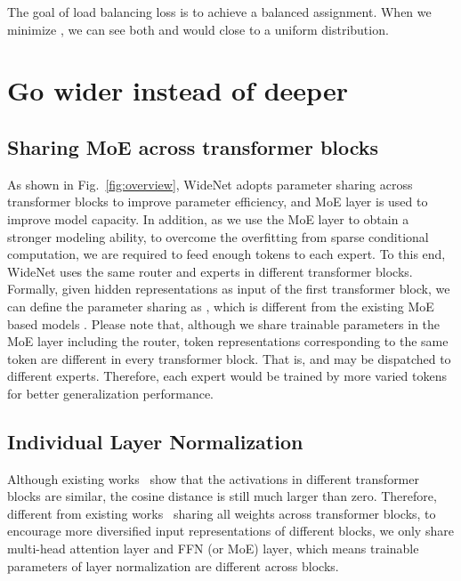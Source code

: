 \documentclass[letterpaper]{article} \usepackage{aaai22}  \usepackage{times}  \usepackage{helvet}  \usepackage{courier}  \usepackage[hyphens]{url}  \usepackage{graphicx} \urlstyle{rm} \def\UrlFont{\rm}  \usepackage{natbib}  \usepackage{caption} \DeclareCaptionStyle{ruled}{labelfont=normalfont,labelsep=colon,strut=off} \frenchspacing  \setlength{\pdfpagewidth}{8.5in}  \setlength{\pdfpageheight}{11in}  \usepackage{algorithm}
\begin{document}
The goal of load balancing loss is to achieve a balanced assignment. When we minimize , we can see both  and  would close to a uniform distribution. 




\section{Go wider instead of deeper}
\label{sec:wide}


\subsection{Sharing MoE across transformer blocks}



As shown in Fig.~\ref{fig:overview}, WideNet adopts parameter sharing across transformer blocks to improve parameter efficiency, and MoE layer is used to improve model capacity. In addition, as we use the MoE layer to obtain a stronger modeling ability, to overcome the overfitting from sparse conditional computation, we are required to feed enough tokens to each expert. To this end, WideNet uses the same router and experts in different transformer blocks. Formally, given hidden representations  as input of the first transformer block, we can define the parameter sharing as , which is different from the existing MoE based models . Please note that, although we share trainable parameters in the MoE layer including the router, token representations corresponding to the same token are different in every transformer block. That is,  and  may be dispatched to different experts. Therefore, each expert would be trained by more varied tokens for better generalization performance. 



\subsection{Individual Layer Normalization}
Although existing works~\citep{lan2019albert} show that the activations in different transformer blocks are similar, the cosine distance is still much larger than zero. Therefore, different from existing works~\citep{dehghani2018universal,lan2019albert} sharing all weights across transformer blocks, to encourage more diversified input representations of different blocks, we only share multi-head attention layer and FFN (or MoE) layer, which means trainable parameters of layer normalization are different across blocks. 
\end{document}
